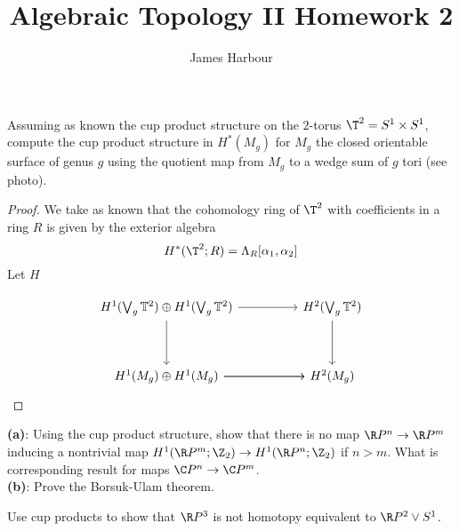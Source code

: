 \documentclass[12pt]{article}
\title{Algebraic Topology II Homework 2}
\author{James Harbour}
\begin{document}
\maketitle

\begin{homeworkProblem}[1]
    Assuming as known the cup product structure on the $ 2 $-torus $ \T^{2} = S^{1}\times S^{1} $, compute the cup product structure in $ H^{*}(M_{g}) $  for $ M_{g} $ the closed orientable surface of genus $ g $ using the quotient map from $ M_{g} $ to a wedge sum of $ g $ tori (see photo).
\end{homeworkProblem}

\begin{proof}
    We take as known that the cohomology ring of $ \T^{2} $ with coefficients in a ring $ R $ is given by  the exterior algebra
    \[
        H^{*}(\T^{2} ; R) = \Lambda_{R}[ \alpha_{1}, \alpha_{2} ]
    \]
    Let $ H $

\[\begin{tikzcd}
	{H^1(\bigvee_g \mathbb{T}^2) \oplus H^1(\bigvee_g \mathbb{T}^2)} && {H^2(\bigvee_g \mathbb{T}^2)} \\
	\\
	{H^1(M_g)\oplus H^1(M_g)} && {H^2(M_g)}
	\arrow[from=1-3, to=3-3]
	\arrow[from=3-1, to=3-3]
	\arrow[from=1-1, to=1-3]
	\arrow[from=1-1, to=3-1]
	\arrow[from=3-1, to=3-3]
\end{tikzcd}\]
\end{proof}

\begin{homeworkProblem}[3]
    \textbf{(a)}: Using the cup product structure, show that there is no map $ \R P^{n}\to  \R P^{m} $ inducing a nontrivial map $ H^{1}(\R P^{m} ; \Z_{2})\to H^{1}(\R P^{n} ; \Z_{2}) $ if $ n > m $. What is corresponding result for maps $ \C P^{n}\to \C P^{m} $.\\

    \textbf{(b)}: Prove the Borsuk-Ulam theorem. 
\end{homeworkProblem}

\begin{homeworkProblem}[7]
    Use cup products to show that $ \R P^{3} $ is not homotopy equivalent to $ \R P^{2}\vee S^{1} $.
\end{homeworkProblem}
\end{document}
